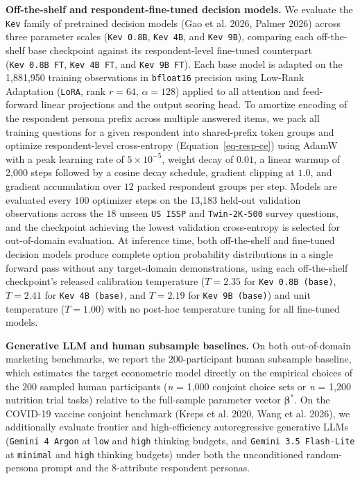 \documentclass[
  letterpaper,
  DIV=11,
  numbers=noendperiod]{scrartcl}
\begin{document}
\textbf{Off-the-shelf and respondent-fine-tuned decision models.} We
evaluate the \texttt{Kev} family of pretrained decision models (Gao et
al. 2026, Palmer 2026) across three parameter scales
(\texttt{Kev\ 0.8B}, \texttt{Kev\ 4B}, and \texttt{Kev\ 9B}), comparing
each off-the-shelf base checkpoint against its respondent-level
fine-tuned counterpart (\texttt{Kev\ 0.8B\ FT}, \texttt{Kev\ 4B\ FT},
and \texttt{Kev\ 9B\ FT}). Each base model is adapted on the 1,881,950
training observations in \texttt{bfloat16} precision using Low-Rank
Adaptation (\texttt{LoRA}, rank \(r = 64\), \(\alpha = 128\)) applied to
all attention and feed-forward linear projections and the output scoring
head. To amortize encoding of the respondent persona prefix across
multiple answered items, we pack all training questions for a given
respondent into shared-prefix token groups and optimize respondent-level
cross-entropy (Equation~\ref{eq-resp-ce}) using AdamW with a peak
learning rate of \(5 \times 10^{-5}\), weight decay of \(0.01\), a
linear warmup of 2,000 steps followed by a cosine decay schedule,
gradient clipping at \(1.0\), and gradient accumulation over \(12\)
packed respondent groups per step. Models are evaluated every \(100\)
optimizer steps on the 13,183 held-out validation observations across
the \(18\) unseen \texttt{US\ ISSP} and \texttt{Twin-2K-500} survey
questions, and the checkpoint achieving the lowest validation
cross-entropy is selected for out-of-domain evaluation. At inference
time, both off-the-shelf and fine-tuned decision models produce complete
option probability distributions in a single forward pass without any
target-domain demonstrations, using each off-the-shelf checkpoint's
released calibration temperature (\(T = 2.35\) for
\texttt{Kev\ 0.8B\ (base)}, \(T = 2.41\) for \texttt{Kev\ 4B\ (base)},
and \(T = 2.19\) for \texttt{Kev\ 9B\ (base)}) and unit temperature
(\(T = 1.00\)) with no post-hoc temperature tuning for all fine-tuned
models.

\textbf{Generative LLM and human subsample baselines.} On both
out-of-domain marketing benchmarks, we report the \(200\)-participant
human subsample baseline, which estimates the target econometric model
directly on the empirical choices of the \(200\) sampled human
participants (\emph{n} = 1,000 conjoint choice sets or \emph{n} = 1,200
nutrition trial tasks) relative to the full-sample parameter vector
\(\boldsymbol{\beta}^*\). On the COVID-19 vaccine conjoint benchmark
(Kreps et al. 2020, Wang et al. 2026), we additionally evaluate frontier
and high-efficiency autoregressive generative LLMs
(\texttt{Gemini\ 4\ Argon} at \texttt{low} and \texttt{high} thinking
budgets, and \texttt{Gemini\ 3.5\ Flash-Lite} at \texttt{minimal} and
\texttt{high} thinking budgets) under both the unconditioned
random-persona prompt and the \(8\)-attribute respondent personas.
\end{document}
